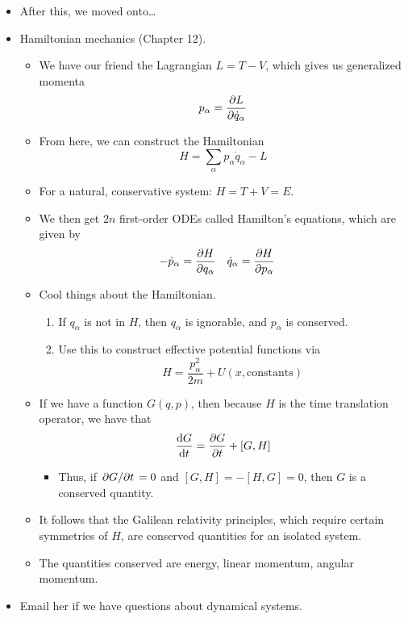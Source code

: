\documentclass[../notes.tex]{subfiles}
\begin{document}
\begin{itemize}
\begin{itemize}
    \end{itemize}
    \item After this, we moved onto\dots
    \item Hamiltonian mechanics (Chapter 12).
    \begin{itemize}
        \item We have our friend the Lagrangian $L=T-V$, which gives us generalized momenta
        \begin{equation*}
            p_\alpha = \pdv{L}{\dot{q}_\alpha}
        \end{equation*}
        \item From here, we can construct the Hamiltonian
        \begin{equation*}
            H = \sum_\alpha p_\alpha\dot{q}_\alpha-L
        \end{equation*}
        \item For a natural, conservative system: $H=T+V=E$.
        \item We then get $2n$ first-order ODEs called Hamilton's equations, which are given by
        \begin{align*}
            -\dot{p}_\alpha &= \pdv{H}{q_\alpha}&
            \dot{q}_\alpha &= \pdv{H}{p_\alpha}
        \end{align*}
        \item Cool things about the Hamiltonian.
        \begin{enumerate}
            \item If $q_\alpha$ is not in $H$, then $q_\alpha$ is ignorable, and $p_\alpha$ is conserved.
            \item Use this to construct effective potential functions via
            \begin{equation*}
                H = \frac{p_\alpha^2}{2m}+U(x,\text{constants})
            \end{equation*}
        \end{enumerate}
        \item If we have a function $G(q,p)$, then because $H$ is the time translation operator, we have that
        \begin{equation*}
            \dv{G}{t} = \pdv{G}{t}+[G,H]
        \end{equation*}
        \begin{itemize}
            \item Thus, if $\pdv*{G}{t}=0$ and $[G,H]=-[H,G]=0$, then $G$ is a conserved quantity.
        \end{itemize}
        \item It follows that the Galilean relativity principles, which require certain symmetries of $H$, are conserved quantities for an isolated system.
        \item The quantities conserved are energy, linear momentum, angular momentum.
    \end{itemize}
    \item Email her if we have questions about dynamical systems.
\end{itemize}
\end{document}
